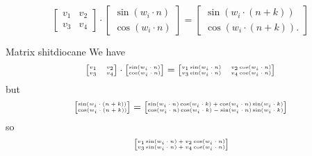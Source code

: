 \documentclass[a4paper,9pt]{extarticle}
\begin{document}
\begin{multicols*}{2}
		\begin{equation*}
			\begin{bmatrix}
				v_{1}&v_{2}\\
				v_{3}&v_{4}
			\end{bmatrix}\cdot\begin{bmatrix}
			\sin(w_{i}\cdot n)\\
			\cos(w_{i}\cdot n)
			\end{bmatrix}=\begin{bmatrix}
			\sin(w_{i}\cdot (n+k))\\
			\cos(w_{i}\cdot (n+k)).
			\end{bmatrix}
		\end{equation*}
		\begin{myproof}{Matrix shit}{diocane}
			We have
			\begin{equation*}
				\tiny
				\begin{bmatrix}
					v_{1}&v_{2}\\
					v_{3}&v_{4}
				\end{bmatrix}\cdot\begin{bmatrix}
					\sin(w_{i}\cdot n)\\
					\cos(w_{i}\cdot n)
				\end{bmatrix}=\begin{bmatrix}
				v_{1}	\sin(w_{i}\cdot n)&v_{2}	\cos(w_{i}\cdot n)\\
				v_{3}	\sin(w_{i}\cdot n)&v_{4}	\cos(w_{i}\cdot n)
				\end{bmatrix}
			\end{equation*}
			but
			\begin{equation*}
				\tiny
				\begin{bmatrix}
					\sin(w_{i}\cdot(n+k))\\
					\cos(w_{i}\cdot(n+k))
				\end{bmatrix}=\begin{bmatrix}
				\sin(w_{i}\cdot n)\cos(w_{i}\cdot k)+\cos(w_{i}\cdot n)\sin(w_{i}\cdot k)\\
				\cos(w_{i}\cdot n)\cos(w_{i}\cdot k)-\sin(w_{i}\cdot n)\sin(w_{i}\cdot k)
				\end{bmatrix}
			\end{equation*}
			so
			\begin{align*}
				\tiny
				&\tiny\begin{bmatrix}
					v_{1}\sin(w_{i}\cdot n)+v_{2}\cos(w_{i}\cdot n)\\
					v_{3}\sin(w_{i}\cdot n)+v_{4}\cos(w_{i}\cdot n)
				\end{bmatrix}\\

\end{align*}
\end{myproof}
\end{multicols*}
\end{document}
